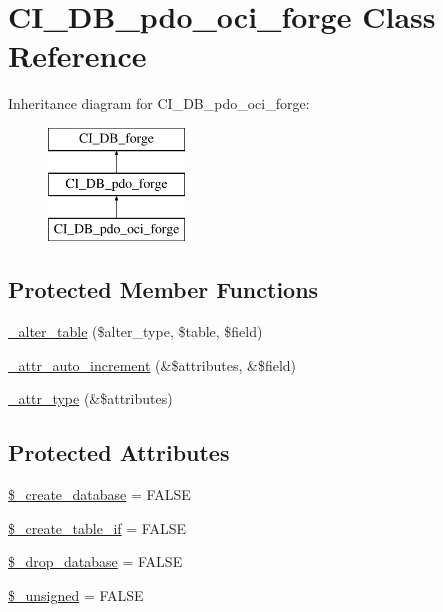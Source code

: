 \hypertarget{class_c_i___d_b__pdo__oci__forge}{}\section{C\+I\+\_\+\+D\+B\+\_\+pdo\+\_\+oci\+\_\+forge Class Reference}
\label{class_c_i___d_b__pdo__oci__forge}
Inheritance diagram for C\+I\+\_\+\+D\+B\+\_\+pdo\+\_\+oci\+\_\+forge\+:\begin{figure}[H]
\begin{center}
\leavevmode
\includegraphics[height=3.000000cm]{class_c_i___d_b__pdo__oci__forge}
\end{center}
\end{figure}
\subsection*{Protected Member Functions}
\begin{DoxyCompactItemize}
\item 
\mbox{\hyperlink{class_c_i___d_b__pdo__oci__forge_a41c6cae02f2fda8b429ad0afb9509426}{\+\_\+alter\+\_\+table}} (\$alter\+\_\+type, \$table, \$field)
\item 
\mbox{\hyperlink{class_c_i___d_b__pdo__oci__forge_a2a013a5932439c3c44f0dad3436525f7}{\+\_\+attr\+\_\+auto\+\_\+increment}} (\&\$attributes, \&\$field)
\item 
\mbox{\hyperlink{class_c_i___d_b__pdo__oci__forge_a8553be952084c6f7cdfff370a1d14f6b}{\+\_\+attr\+\_\+type}} (\&\$attributes)
\end{DoxyCompactItemize}
\subsection*{Protected Attributes}
\begin{DoxyCompactItemize}
\item 
\mbox{\hyperlink{class_c_i___d_b__pdo__oci__forge_acd23c9a8735806155f1a5d0a87c151f2}{\$\+\_\+create\+\_\+database}} = F\+A\+L\+SE
\item 
\mbox{\hyperlink{class_c_i___d_b__pdo__oci__forge_a2f6484fcb8d1dc3eef67a637227cd583}{\$\+\_\+create\+\_\+table\+\_\+if}} = F\+A\+L\+SE
\item 
\mbox{\hyperlink{class_c_i___d_b__pdo__oci__forge_a8305b12fc17f6f87778260ebdff287b4}{\$\+\_\+drop\+\_\+database}} = F\+A\+L\+SE
\item 
\mbox{\hyperlink{class_c_i___d_b__pdo__oci__forge_aae977ae6d61fa183f0b25422b6ddc31c}{\$\+\_\+unsigned}} = F\+A\+L\+SE
\end{DoxyCompactItemize}
